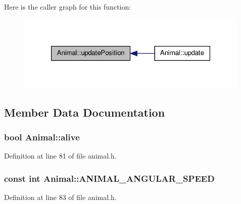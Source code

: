 Here is the caller graph for this function\-:
\nopagebreak
\begin{figure}[H]
\begin{center}
\leavevmode
\includegraphics[width=316pt]{class_animal_a0b6103b76a223ce2eaad73877ff85c73_icgraph}
\end{center}
\end{figure}




\subsection{Member Data Documentation}
\hypertarget{class_animal_a38d08d48cf5b16863bb40fa731b06629}{
\subsubsection[{alive}]{\setlength{\rightskip}{0pt plus 5cm}bool Animal\-::alive\hspace{0.3cm}{\ttfamily [protected]}}}\label{class_animal_a38d08d48cf5b16863bb40fa731b06629}


Definition at line 81 of file animal.\-h.

\hypertarget{class_animal_a4004efb93813a375712ad5d82a404659}{
\subsubsection[{A\-N\-I\-M\-A\-L\-\_\-\-A\-N\-G\-U\-L\-A\-R\-\_\-\-S\-P\-E\-E\-D}]{\setlength{\rightskip}{0pt plus 5cm}const int Animal\-::\-A\-N\-I\-M\-A\-L\-\_\-\-A\-N\-G\-U\-L\-A\-R\-\_\-\-S\-P\-E\-E\-D\hspace{0.3cm}{\ttfamily [protected]}}}\label{class_animal_a4004efb93813a375712ad5d82a404659}


Definition at line 83 of file animal.\-h.

